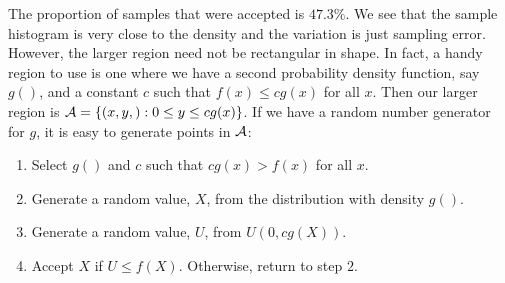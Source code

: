 The proportion of samples that were accepted is $47.3\%$.
We see that the sample histogram is very close to the
density and the variation is just sampling error.
However, the larger region need not be rectangular in shape. 
In fact, a handy region to use 
is one where  we have a second probability density function, say $g()$, 
and a constant $c$ such that   $f(x) \le cg(x)$ for all $x$.
Then our larger region is ${\cal{A}} = \{  (x,y,): 0 \le y \le cg(x) \}$.
If we have a random number generator for $g$, it is easy to
generate points in $\cal{A}$:

\begin{enumerate}
\item Select $g()$ and $c$ such that  
    $c g(x) > f(x)$ for all $ x$.
\item Generate a random value, $X$,  from the distribution with density $g()$.
\item Generate a random value, $U$, from $U(0, c g(X))$.
\item Accept $X$ if $U \le f(X)$.
  Otherwise, return to step $2$.
\end{enumerate}

